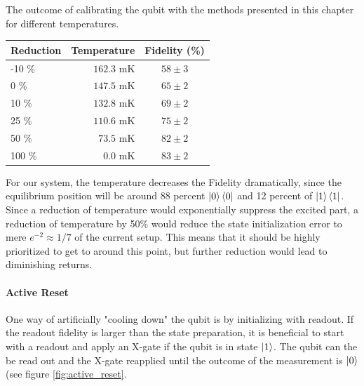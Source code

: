\begin{margintable}
\centering
\caption{The outcome of calibrating the qubit with the methods presented in this chapter for different temperatures.}
\vspace{0.3 cm}
\begin{tabular}{lr|c}
\hline
\textbf{Reduction}        & Temperature                  & Fidelity (\%)\\ \hline
-10 \%                    &  $162.3 $ mK       &  $58 \pm 3$\\
0   \%                    &  $147.5 $ mK       &  $65 \pm 2$\\
10  \%                    &  $132.8 $ mK       &  $69 \pm 2$\\
25  \%                    &  $110.6 $ mK       &  $75 \pm 2$\\
50  \%                    &  $\; 73.5$  mK     &  $82 \pm 2$\\
100 \%                    &  $\;\; 0.0$  mK    &  $83 \pm 2$\\
\end{tabular}
\label{tab:temperature_contribution_estimation}
\end{margintable}
For our system, the temperature decreases the Fidelity dramatically, since the equilibrium position will be around 88 percent $\ket{0}\bra{0}$ and 12 percent of $\ket{1}\bra{1}$. Since a reduction of temperature would exponentially suppress the excited part, a reduction of temperature by 50\% would reduce the state initialization error to mere $e^{-2}\approx 1/7$ of the current setup. This means that it should be highly prioritized to get to around this point, but further reduction  would lead to diminishing returns.

\paragraph{Active Reset} One way of artificially "cooling down" the qubit is by initializing with readout. If the readout fidelity is larger than the state preparation, it is beneficial to start with a readout and apply an X-gate if the qubit is in state $\ket{1}$. The qubit can the be read out and the X-gate reapplied until the outcome of the measurement is $\ket{0}$ (see figure \ref{fig:active_reset}.

